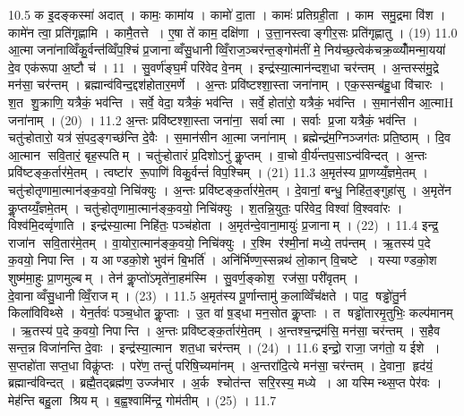 10.5
क इ॒दङ्कस्मा॑ अदात् । कामः॒ कामा॑य । कामो॑ दा॒ता । कामः॑ प्रतिग्रही॒ता । काम समु॒द्रमा वि॑श । कामे॑न त्वा॒ प्रति॑गृह्णामि । कामै॒तत्ते । ए॒षा ते॑ काम॒ दक्षि॑णा । उ॒त्ता॒नस्त्वाङ्गीर॒सः प्रति॑गृह्णातु । (19)
11.0
आ॒त्मा जना॑नाव्विँकु॒र्वन्त॑व्विँप॒श्चिं प्र॒जानाव्वँसु॒धानीव्विँ॒राज॒ञ्चर॑न्त॒ङ्गोम॑तीं मे॒ निय॑च्छ॒त्वेक॑चक्र॒व्व्योँ॑मन्मा॒यया॑ दे॒व एक॑रूपा अ॒ष्टौ च॑ । 11 ।
सु॒वर्ण॑ङ्घ॒र्मं परि॑वेद वे॒नम् । इन्द्र॑स्या॒त्मान॑न्दश॒धा चर॑न्तम् । अ॒न्तस्स॑मु॒द्रे मन॑सा॒ चर॑न्तम् । ब्रह्मान्व॑विन्द॒द्दश॑होतार॒मर्णे । अ॒न्तः प्रवि॑ष्टश्शा॒स्ता जना॑नाम् । एक॒स्सन्ब॑हु॒धा वि॑चारः । श॒त शु॒क्राणि॒ यत्रैकं॒ भव॑न्ति । सर्वे॒ वेदा॒ यत्रैकं॒ भव॑न्ति । सर्वे॒ होता॑रो॒ यत्रैकं॒ भव॑न्ति । स॒मान॑सीन आ॒त्माH जना॑नाम् । (20) ।
11.2
अ॒न्तः प्रवि॑ष्टश्शा॒स्ता जना॑ना॒ सर्वात्मा । सर्वाः प्र॒जा यत्रैकं॒ भव॑न्ति । चतु॑ऱ्होतारो॒ यत्र॑ सं॒पद॒ङ्गच्छ॑न्ति दे॒वैः । स॒मान॑सीन आ॒त्मा जना॑नाम् । ब्रह्मेन्द्र॑म॒ग्निञ्जग॑तः प्रति॒ष्ठाम् । दि॒व आ॒त्मान सवि॒तारं॒ बृह॒स्पतिम् । चतु॑ऱ्होतारं प्र॒दिशोऽनु॑ कॢ॒प्तम् । वा॒चो वी॒र्य॑न्तप॒साऽन्व॑विन्दत् । अ॒न्तः प्रवि॑ष्टङ्क॒र्तार॑मे॒तम् । त्वष्टा॑र रू॒पाणि॑ विकु॒र्वन्तं॑ विप॒श्चिम् । (21)
11.3
अ॒मृत॑स्य प्रा॒णय्यँ॒ज्ञमे॒तम् । चतु॑ऱ्होतृणामा॒त्मान॑ङ्क॒वयो॒ निचि॑क्युः । अ॒न्तः प्रवि॑ष्टङ्क॒र्तार॑मे॒तम् । दे॒वानां॒ बन्धु॒ निहि॑त॒ङ्गुहा॑सु । अ॒मृते॑न कॢ॒प्तय्यँ॒ज्ञमे॒तम् । चतु॑ऱ्होतृणामा॒त्मान॑ङ्क॒वयो॒ निचि॑क्युः । श॒तन्नि॒युतः॒ परि॑वेद॒ विश्वा॑ वि॒श्ववा॑रः । विश्व॑मि॒दव्वृं॑णाति । इन्द्र॑स्या॒त्मा निहि॑तः॒ पञ्च॑होता । अ॒मृत॑न्दे॒वाना॒मायुः॑ प्र॒जानाम् । (22) ।
11.4
इन्द्र॒ राजा॑न सवि॒तार॑मे॒तम् । वा॒योरा॒त्मान॑ङ्क॒वयो॒ निचि॑क्युः । र॒श्मि र॑श्मी॒नां मध्ये॒ तप॑न्तम् । ऋ॒तस्य॑ प॒दे क॒वयो॒ निपान्ति । य आण्डको॒शे भुव॑नं बि॒भर्ति॑ । अनि॑र्भिण्ण॒स्सन्नथ॑ लो॒कान् वि॒चष्टे । यस्याण्डको॒श शुष्म॑मा॒हुः प्रा॒णमुल्बम् । तेन॑ कॢ॒प्तो॑ऽमृते॑ना॒हम॑स्मि । सु॒वर्ण॒ङ्कोश॒ रज॑सा॒ परी॑वृतम् । दे॒वानाव्वँसु॒धानीव्विँ॒राजम् । (23) ।
11.5
अ॒मृत॑स्य पू॒र्णान्तामु॑ क॒लाव्विँच॑क्षते । पाद॒ षड्ढो॑तु॒र्न किला॑विविथ्से । येन॒र्तवः॑ पञ्च॒धोत कॢ॒प्ताः । उ॒त वा॑ ष़॒ड्धा मन॒सोत कॢ॒प्ताः । त षड्ढो॑तारमृ॒तुभिः॒ कल्प॑मानम् । ऋ॒तस्य॑ प॒दे क॒वयो॒ निपान्ति । अ॒न्तः प्रवि॑ष्टङ्क॒र्तार॑मे॒तम् । अ॒न्तश्च॒न्द्रम॑सि॒ मन॑सा॒ चर॑न्तम् । स॒हैव सन्त॒न्न विजा॑नन्ति दे॒वाः । इन्द्र॑स्या॒त्मान शत॒धा चर॑न्तम् । (24) ।
11.6
इन्द्रो॒ राजा॒ जग॑तो॒ य ईशे । स॒प्तहो॑ता सप्त॒धा विकॢ॑प्तः । परे॑ण॒ तन्तुं॑ परिषि॒च्यमा॑नम् । अ॒न्तरा॑दि॒त्ये मन॑सा॒ चर॑न्तम् । दे॒वाना॒ हृद॑यं॒ ब्रह्मान्व॑विन्दत् । ब्रह्मै॒तद्ब्रह्म॑ण॒ उज्ज॑भार । अ॒र्क श्चोत॑न्त सरि॒रस्य॒ मध्ये । आ यस्मिन्थ्स॒प्त पेर॑वः । मेह॑न्ति बहु॒ला श्रियम् । ब॒ह्व॒श्वामि॑न्द्र॒ गोम॑तीम् । (25) ।
11.7
